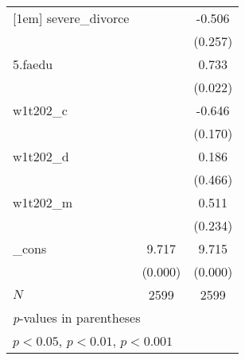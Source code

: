{\begin{tabular}{l*{2}{c}}
[1em]
severe\_divorce&                     &      -0.506         \\
            &                     &     (0.257)         \\
[1em]
5.faedu     &                     &       0.733\sym{*}  \\
            &                     &     (0.022)         \\
[1em]
w1t202\_c    &                     &      -0.646         \\
            &                     &     (0.170)         \\
[1em]
w1t202\_d    &                     &       0.186         \\
            &                     &     (0.466)         \\
[1em]
w1t202\_m    &                     &       0.511         \\
            &                     &     (0.234)         \\
[1em]
\_cons      &       9.717\sym{***}&       9.715\sym{***}\\
            &     (0.000)         &     (0.000)         \\
\hline
\(N\)       &        2599         &        2599         \\
\hline\hline
\multicolumn{3}{l}{\footnotesize \textit{p}-values in parentheses}\\
\multicolumn{3}{l}{\footnotesize \sym{*} \(p<0.05\), \sym{**} \(p<0.01\), \sym{***} \(p<0.001\)}\\
\end{tabular}
}
